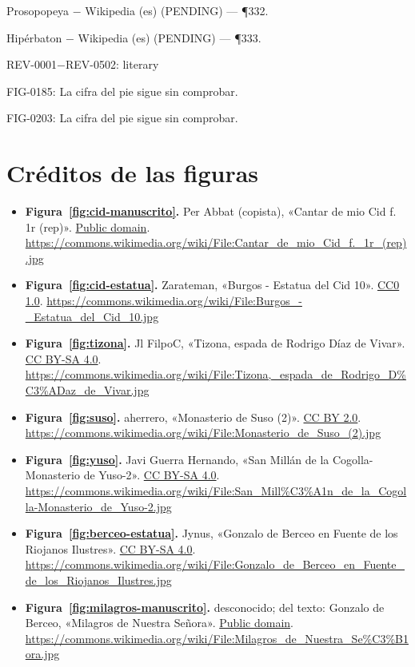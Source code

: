 \documentclass{book}
\begin{document}
\noindent Prosopopeya \(-\) Wikipedia (es) (PENDING) --- \P332.

\noindent Hipérbaton \(-\) Wikipedia (es) (PENDING) --- \P333.

\noindent REV-0001\(-\)REV-0502: literary

\noindent FIG-0185: La cifra del pie sigue sin comprobar.

\noindent FIG-0203: La cifra del pie sigue sin comprobar.
\chapter*{Créditos de las figuras}
\begin{itemize}
\item \textbf{Figura~\ref{fig:cid-manuscrito}.} Per Abbat (copista), «Cantar de mio Cid f. 1r (rep)». \href{https://creativecommons.org/publicdomain/mark/1.0/}{Public domain}. \url{https://commons.wikimedia.org/wiki/File:Cantar_de_mio_Cid_f._1r_(rep).jpg}
\item \textbf{Figura~\ref{fig:cid-estatua}.} Zarateman, «Burgos - Estatua del Cid 10». \href{https://creativecommons.org/publicdomain/zero/1.0/}{CC0 1.0}. \url{https://commons.wikimedia.org/wiki/File:Burgos_-_Estatua_del_Cid_10.jpg}
\item \textbf{Figura~\ref{fig:tizona}.} Jl FilpoC, «Tizona, espada de Rodrigo Díaz de Vivar». \href{https://creativecommons.org/licenses/by-sa/4.0/}{CC BY-SA 4.0}. \url{https://commons.wikimedia.org/wiki/File:Tizona,_espada_de_Rodrigo_D%C3%ADaz_de_Vivar.jpg}
\item \textbf{Figura~\ref{fig:suso}.} aherrero, «Monasterio de Suso (2)». \href{https://creativecommons.org/licenses/by/2.0/}{CC BY 2.0}. \url{https://commons.wikimedia.org/wiki/File:Monasterio_de_Suso_(2).jpg}
\item \textbf{Figura~\ref{fig:yuso}.} Javi Guerra Hernando, «San Millán de la Cogolla-Monasterio de Yuso-2». \href{https://creativecommons.org/licenses/by-sa/4.0/}{CC BY-SA 4.0}. \url{https://commons.wikimedia.org/wiki/File:San_Mill%C3%A1n_de_la_Cogolla-Monasterio_de_Yuso-2.jpg}
\item \textbf{Figura~\ref{fig:berceo-estatua}.} Jynus, «Gonzalo de Berceo en Fuente de los Riojanos Ilustres». \href{https://creativecommons.org/licenses/by-sa/4.0/}{CC BY-SA 4.0}. \url{https://commons.wikimedia.org/wiki/File:Gonzalo_de_Berceo_en_Fuente_de_los_Riojanos_Ilustres.jpg}
\item \textbf{Figura~\ref{fig:milagros-manuscrito}.} desconocido; del texto: Gonzalo de Berceo, «Milagros de Nuestra Señora». \href{https://creativecommons.org/publicdomain/mark/1.0/}{Public domain}. \url{https://commons.wikimedia.org/wiki/File:Milagros_de_Nuestra_Se%C3%B1ora.jpg}

\end{itemize}
\end{document}
